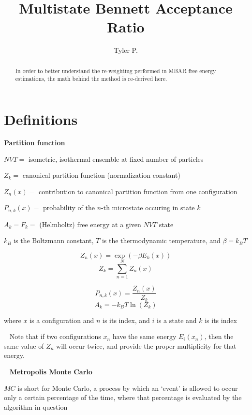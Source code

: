 \documentclass[]{article}
\title{Multistate Bennett Acceptance Ratio}
\author{Tyler P.}
\begin{document}
	
\maketitle

\begin{abstract}
	In order to better understand the re-weighting performed in MBAR free energy estimations, the math behind the method is re-derived here.
\end{abstract}

\section*{Definitions}
\textbf{Partition function}

$NVT =$ isometric, isothermal ensemble at fixed number of particles

$Z_k =$ canonical partition function (normalization constant)

$Z_n(x) =$ contribution to canonical partition function from one configuration

$P_{n,k}(x) =$ probability of the $n$-th microstate occuring in state $k$

$ A_k = F_k =$ (Helmholtz) free energy at a given $NVT$ state

$k_B$ is the Boltzmann constant, $T$ is the thermodynamic temperature, and $\beta = k_B T$

\begin{minipage}[b]{0.5\linewidth}
	\[ Z_n(x) = \exp(-\beta E_k(x)) \]
	\[ Z_k = \sum_{n=1}^{N} Z_n(x) \]
\end{minipage}
\begin{minipage}[b]{0.5\linewidth}
	\[ P_{n,k}(x) = \frac{Z_n(x)}{Z_k} \]
	\[ A_k = -k_B T \ln(Z_k) \]
\end{minipage}

where $x$ is a configuration and $n$ is its index,
and $i$ is a state and $k$ is its index

~\linebreak
Note that if two configurations $x_n$ have the same energy $E_i(x_n)$, then the same value of $Z_n$ will occur twice, and provide the proper multiplicity for that energy.

~\linebreak
\textbf{Metropolis Monte Carlo}\cite{bennett}

{ \hangindent=30pt
$MC$ is short for Monte Carlo, a process by which an `event' is allowed to occur only a certain percentage of the time, where that percentage is evaluated by the algorithm in question
}
\end{document}
